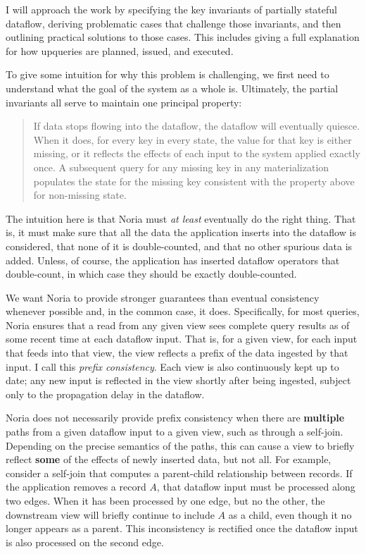 \documentclass[12pt,letterpaper,twoside]{article}
\begin{document}
I will approach the work by specifying the key invariants of partially stateful
dataflow, deriving problematic cases that challenge those invariants, and then
outlining practical solutions to those cases. This includes giving a full
explanation for how upqueries are planned, issued, and executed.

To give some intuition for why this problem is challenging, we first need to
understand what the goal of the system as a whole is. Ultimately, the partial
invariants all serve to maintain one principal property:

\begin{quote}
	If data stops flowing into the dataflow, the dataflow will eventually
	quiesce. When it does, for every key in every state, the value for that
	key is either missing, or it reflects the effects of each input to the
	system applied exactly once. A subsequent query for any missing key in
	any materialization populates the state for the missing key consistent
	with the property above for non-missing state.
\end{quote}

The intuition here is that Noria must \emph{at least} eventually do the right
thing. That is, it must make sure that all the data the application inserts into
the dataflow is considered, that none of it is double-counted, and that no other
spurious data is added. Unless, of course, the application has inserted dataflow
operators that double-count, in which case they should be exactly
double-counted.

We want Noria to provide stronger guarantees than eventual consistency whenever
possible and, in the common case, it does. Specifically, for most queries, Noria
ensures that a read from any given view sees complete query results as of some
recent time at each dataflow input. That is, for a given view, for each input
that feeds into that view, the view reflects a prefix of the data ingested by
that input. I call this \emph{prefix consistency}. Each view is also
continuously kept up to date; any new input is reflected in the view shortly
after being ingested, subject only to the propagation delay in the dataflow.

Noria does not necessarily provide prefix consistency when there are
\textbf{multiple} paths from a given dataflow input to a given view, such as
through a self-join. Depending on the precise semantics of the paths, this can
cause a view to briefly reflect \textbf{some} of the effects of newly inserted
data, but not all. For example, consider a self-join that computes a
parent-child relationship between records. If the application removes a record
$A$, that dataflow input must be processed along two edges. When it has been
processed by one edge, but no the other, the downstream view will briefly
continue to include $A$ as a child, even though it no longer appears as a
parent. This inconsistency is rectified once the dataflow input is also
processed on the second edge.
\end{document}
